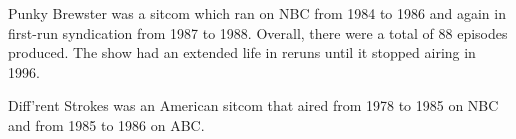 Punky Brewster was a sitcom which ran on NBC from 1984 to 1986 and again in first-run syndication from 1987 to 1988. Overall, there were a total of 88 episodes produced. The show had an extended life in reruns until it stopped airing in 1996.

Diff'rent Strokes was an American sitcom that aired from 1978 to 1985 on NBC and from 1985 to 1986 on ABC.
